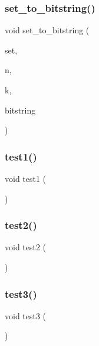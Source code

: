 \subsubsection{\texorpdfstring{set\+\_\+to\+\_\+bitstring()}{set\_to\_bitstring()}}
{\footnotesize\ttfamily void set\+\_\+to\+\_\+bitstring (\begin{DoxyParamCaption}\item[{\mbox{\hyperlink{galois_8h_a09fddde158a3a20bd2dcadb609de11dc}{I\+NT}} $\ast$}]{set,  }\item[{\mbox{\hyperlink{galois_8h_a09fddde158a3a20bd2dcadb609de11dc}{I\+NT}}}]{n,  }\item[{\mbox{\hyperlink{galois_8h_a09fddde158a3a20bd2dcadb609de11dc}{I\+NT}}}]{k,  }\item[{\mbox{\hyperlink{galois_8h_a09fddde158a3a20bd2dcadb609de11dc}{I\+NT}} $\ast$}]{bitstring }\end{DoxyParamCaption})}

\mbox{\label{test2_8_c_a1440a7779ac56f47a3f355ce4a8c7da0}} 
\subsubsection{\texorpdfstring{test1()}{test1()}}
{\footnotesize\ttfamily void test1 (\begin{DoxyParamCaption}{ }\end{DoxyParamCaption})}

\mbox{\label{test2_8_c_a0283886819c7c140a023582b7269e2d0}} 
\subsubsection{\texorpdfstring{test2()}{test2()}}
{\footnotesize\ttfamily void test2 (\begin{DoxyParamCaption}{ }\end{DoxyParamCaption})}

\mbox{\label{test2_8_c_a6d0455dd5c30adda100e95f0423c786e}} 
\subsubsection{\texorpdfstring{test3()}{test3()}}
{\footnotesize\ttfamily void test3 (\begin{DoxyParamCaption}{ }\end{DoxyParamCaption})}

